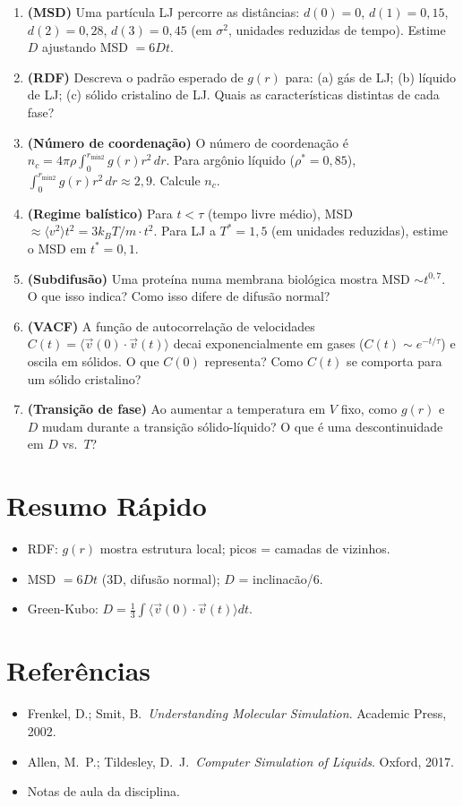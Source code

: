 \documentclass[12pt,a4paper]{article}
\begin{document}
\begin{enumerate}
  \item \textbf{(MSD)} Uma part\'icula LJ percorre as dist\^ancias: $d(0)=0$, $d(1)=0{,}15$, $d(2)=0{,}28$, $d(3)=0{,}45$ (em $\sigma^2$, unidades reduzidas de tempo). Estime $D$ ajustando MSD $= 6Dt$.
  
  \item \textbf{(RDF)} Descreva o padr\~ao esperado de $g(r)$ para: (a) g\'as de LJ; (b) l\'iquido de LJ; (c) s\'olido cristalino de LJ. Quais as caracter\'isticas distintas de cada fase?
  
  \item \textbf{(N\'umero de coordena\c{c}\~ao)} O n\'umero de coordena\c{c}\~ao \'e $n_c = 4\pi\rho\int_0^{r_\text{min2}} g(r)r^2\,dr$. Para argônio l\'iquido ($\rho^*=0{,}85$), $\int_0^{r_\text{min2}} g(r)r^2\,dr \approx 2{,}9$. Calcule $n_c$.
  
  \item \textbf{(Regime bal\'istico)} Para $t < \tau$ (tempo livre m\'edio), MSD $\approx \langle v^2\rangle t^2 = 3k_BT/m \cdot t^2$. Para LJ a $T^*=1{,}5$ (em unidades reduzidas), estime o MSD em $t^*=0{,}1$.
  
  \item \textbf{(Subdifus\~ao)} Uma prote\'ina numa membrana biol\'ogica mostra MSD $\sim t^{0{,}7}$. O que isso indica? Como isso difere de difus\~ao normal?
  
  \item \textbf{(VACF)} A fun\c{c}\~ao de autocorrela\c{c}\~ao de velocidades $C(t) = \langle\vec{v}(0)\cdot\vec{v}(t)\rangle$ decai exponencialmente em gases ($C(t) \sim e^{-t/\tau}$) e oscila em s\'olidos. O que $C(0)$ representa? Como $C(t)$ se comporta para um s\'olido cristalino?
  
  \item \textbf{(Transi\c{c}\~ao de fase)} Ao aumentar a temperatura em $V$ fixo, como $g(r)$ e $D$ mudam durante a transi\c{c}\~ao s\'olido-l\'iquido? O que \'e uma descontinuidade em $D$ vs.\ $T$?
\end{enumerate}

\section*{Resumo R\'apido}
\begin{itemize}
  \item RDF: $g(r)$ mostra estrutura local; picos = camadas de vizinhos.
  \item MSD $= 6Dt$ (3D, difus\~ao normal); $D$ = inclinac\~ao/6.
  \item Green-Kubo: $D = \frac{1}{3}\int\langle\vec{v}(0)\cdot\vec{v}(t)\rangle dt$.
\end{itemize}

\section*{Refer\^encias}
\begin{itemize}
  \item Frenkel, D.; Smit, B.\ \textit{Understanding Molecular Simulation}. Academic Press, 2002.
  \item Allen, M.\ P.; Tildesley, D.\ J.\ \textit{Computer Simulation of Liquids}. Oxford, 2017.
  \item Notas de aula da disciplina.
\end{itemize}
\end{document}
